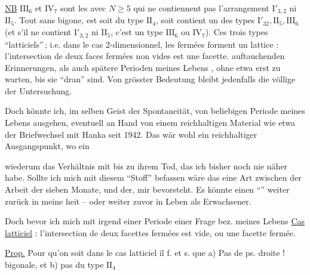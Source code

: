 \uline{NB} $\mathrm{III}_{6}$ et $\mathrm{IV}_{7}$ sont  les   avec $N\geq5$ qui ne contiennent pas l'arrangement $\mathrm I'_{3,2}$ ni $\mathrm{II}_5$. Tout  sans bigone,  est soit du type $\mathrm{II}_4$, soit contient un des types $\boxed{\mathrm I'_{32},\mathrm{II}_5,\mathrm{III}_6}$ (et s'il ne contient $\mathrm I'_{3,2}$ ni $\mathrm{II}_5$, c'est un type $\mathrm{III}_6$ ou $\mathrm{IV}_7$). Ces trois types  ``latticiels''\,; i.e. dans le cas 2-dimensionnel, les  fermées forment un lattice :  l'intersection de deux faces fermées non vides est une facette.
 auftauchenden Erinnerungen, als auch spätere Perioden meines Lebens , ohne etwa erst zu warten, bis sie ``dran'' sind. Von grösster Bedeutung bleibt jedenfalls die völlige  der Untersuchung.

Doch könnte ich, im selben Geist der Spontaneität, von  beliebigen Periode meines Lebens ausgehen, eventuell an Hand von einem reichhaltigen Material wie etwa der Briefwechsel mit Hanka seit 1942. Das wär wohl ein reichhaltiger Ausgangspunkt, wo ein 

wiederum das Verhältnis mit  bis zu ihrem Tod, das ich bisher noch nie näher  habe. Sollte ich mich  mit diesem ``Stoff'' befassen wäre das eine Art  zwischen der Arbeit der  sieben Monate, und der,  mir bevorsteht. Es könnte einen ``''   weiter zurück in meine heit -- oder weiter zuvor in Leben als Erwachsener.

Doch bevor ich mich  mit irgend einer Periode  einer Frage bez. meines Lebens
\uline{Cas latticiel} : l'intersection de deux facettes fermées est vide, ou une facette fermée.

\uline{Prop.} Pour qu'on soit dans le cas latticiel il f. et s. que a) Pas de ps. droite ! bigonale, et b) pas du type $\mathrm{II}_{4}$

